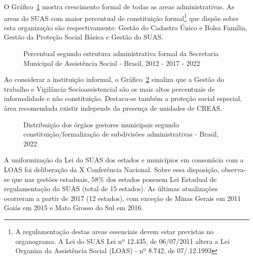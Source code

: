\documentclass[
  letterpaper,
  DIV=11,
  numbers=noendperiod]{scrreprt}
\begin{document}
O Gráfico~\ref{fig-munic_sub} mostra crescimento formal de todas as
areas administrativas. As areas do SUAS com maior percentual de
constituição formal\footnote{A regulamentação destas areas essenciais
  devem estar previstas no organograma. A Lei do SUAS Lei nº 12.435, de
  06/07/2011 altera a Lei Organiza da Assistência Social (LOAS) - nº
  8.742, de 07/.12.1993} que dispõe sobre esta organização são
respectivamente: Gestão do Cadastro Único e Bolsa Família, Gestão da
Proteção Social Básica e Gestão do SUAS.

\begin{figure}


\caption{\label{fig-munic_sub}Percentual segundo estrutura
administrativa formal da Secretaria Municipal de Assistência Social -
Brasil, 2012 - 2017 - 2022}

\end{figure}%

Ao considerar a instituição informal, o
Gráfico~\ref{fig-municipais-constituicao-subdivisoes} sinaliza que a
Gestão do trabalho e Vigilância Socioassistencial são os mais altos
percentuais de informalidade e não constituição. Destaca-se também a
proteção social especial, área recomendada existir independe da presença
de unidades de CREAS.

\begin{figure}


\caption{\label{fig-municipais-constituicao-subdivisoes}Distribuição dos
órgãos gestores municipais segundo constituição/formalização de
subdivisões administrativas - Brasil, 2022}

\end{figure}%

A uniformização da Lei do SUAS dos estados e municípios em consonâcia
com a LOAS foi deliberação da X Conferência Nacional. Sobre essa
disposição, observa-se que nas gestões estaduais, 58\% dos estados
possuem Lei Estadual de regulamentação do SUAS (total de 15 estados). As
últimas atualizações ocorreram a partir de 2017 (12 estados), com
exceção de Minas Gerais em 2011 Goiás em 2015 e Mato Grosso do Sul em
2016.
\end{document}
